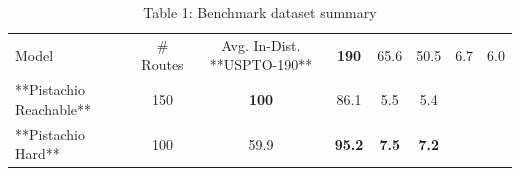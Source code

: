 \begin{table}[t]
\centering
\caption{Table 1: Benchmark dataset summary}
\label{tab:2407.06334}
\begin{tabular}{lccccc}
\toprule
Model & # Routes & Avg. In-Dist. %
\midrule
**USPTO-190** & \textbf{190} & 65.6 & 50.5 & 6.7 & 6.0 \\
**Pistachio Reachable** & 150 & \textbf{100} & 86.1 & 5.5 & 5.4 \\
**Pistachio Hard** & 100 & 59.9 & \textbf{95.2} & \textbf{7.5} & \textbf{7.2} \\
\bottomrule
\end{tabular}
\end{table}
